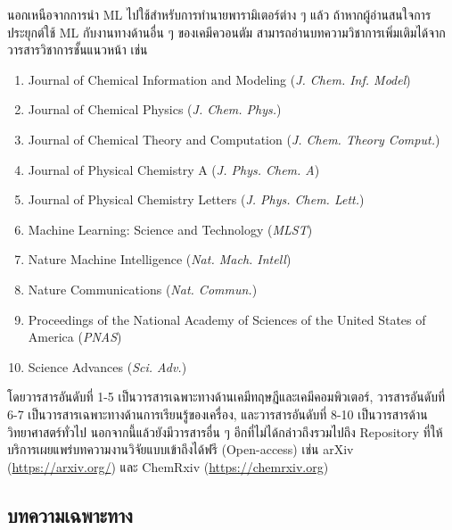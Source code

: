 นอกเหนือจากการนำ ML ไปใช้สำหรับการทำนายพารามิเตอร์ต่าง ๆ แล้ว ถ้าหากผู้อ่านสนใจการประยุกต์ใช้ ML กับงานทางด้านอื่น ๆ ของเคมีควอนตัม
สามารถอ่านบทความวิชาการเพิ่มเติมได้จากวารสารวิชาการชั้นแนวหน้า เช่น
%
\begin{enumerate}[topsep=0pt,noitemsep]\setlength\itemsep{0.5em}
    \item Journal of Chemical Information and Modeling (\textit{J. Chem. Inf. Model})

    \item Journal of Chemical Physics (\textit{J. Chem. Phys.})

    \item Journal of Chemical Theory and Computation (\textit{J. Chem. Theory Comput.})

    \item Journal of Physical Chemistry A (\textit{J. Phys. Chem. A})

    \item Journal of Physical Chemistry Letters (\textit{J. Phys. Chem. Lett.})

    \item Machine Learning: Science and Technology (\textit{MLST})

    \item Nature Machine Intelligence (\textit{Nat. Mach. Intell})

    \item Nature Communications (\textit{Nat. Commun.})

    \item Proceedings of the National Academy of Sciences of the United States of America (\textit{PNAS})

    \item Science Advances (\textit{Sci. Adv.})
\end{enumerate}

\noindent โดยวารสารอันดับที่ 1-5 เป็นวารสารเฉพาะทางด้านเคมีทฤษฎีและเคมีคอมพิวเตอร์, วารสารอันดับที่ 6-7 เป็นวารสารเฉพาะทางด้านการเรียนรู้ของเครื่อง, และวารสารอันดับที่ 8-10 เป็นวารสารด้านวิทยาศาสตร์ทั่วไป นอกจากนี้แล้วยังมีวารสารอื่น ๆ อีกที่ไม่ได้กล่าวถึงรวมไปถึง Repository ที่ให้บริการเผยแพร่บทความงานวิจัยแบบเข้าถึงได้ฟรี (Open-access) เช่น arXiv (\url{https://arxiv.org/}) และ ChemRxiv (\url{https://chemrxiv.org})

\subsection{บทความเฉพาะทาง}
\label{ssec:pred_misc_papers_specific}

